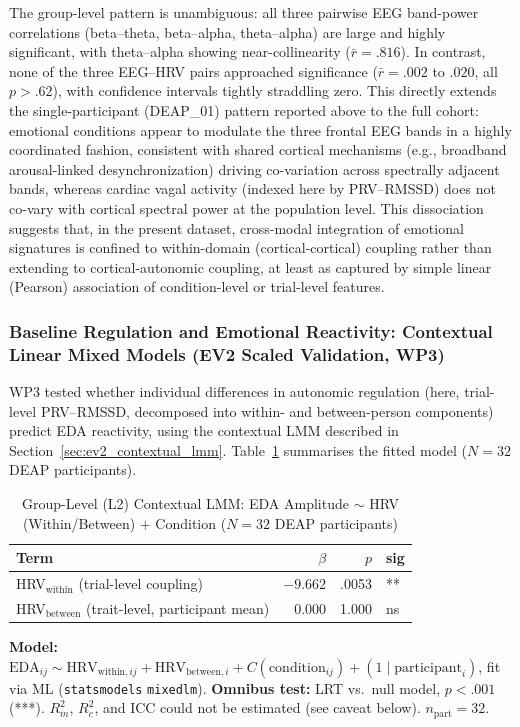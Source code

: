 The group-level pattern is unambiguous: all three pairwise EEG band-power correlations (beta--theta, beta--alpha, theta--alpha) are large and highly significant, with theta--alpha showing near-collinearity ($\bar{r} = .816$). In contrast, none of the three EEG--HRV pairs approached significance ($\bar{r} = .002$ to $.020$, all $p > .62$), with confidence intervals tightly straddling zero. This directly extends the single-participant (DEAP\_01) pattern reported above to the full cohort: emotional conditions appear to modulate the three frontal EEG bands in a highly coordinated fashion, consistent with shared cortical mechanisms (e.g., broadband arousal-linked desynchronization) driving co-variation across spectrally adjacent bands, whereas cardiac vagal activity (indexed here by \gls{PRV}--\gls{RMSSD}) does not co-vary with cortical spectral power at the population level. This dissociation suggests that, in the present dataset, cross-modal integration of emotional signatures is confined to within-domain (cortical-cortical) coupling rather than extending to cortical-autonomic coupling, at least as captured by simple linear (Pearson) association of condition-level or trial-level features.

\subsubsection{Baseline Regulation and Emotional Reactivity: Contextual Linear Mixed Models (EV2 Scaled Validation, WP3)}
\label{subsec:wp3_contextual}

WP3 tested whether individual differences in autonomic regulation (here, trial-level \gls{PRV}--\gls{RMSSD}, decomposed into within- and between-person components) predict \gls{EDA} reactivity, using the contextual \gls{LMM} described in Section~\ref{sec:ev2_contextual_lmm}. Table~\ref{tab:wp3_l2} summarises the fitted model ($N = 32$ DEAP participants).

\begin{table}[htbp]
    \centering
    \caption{Group-Level (L2) Contextual LMM: EDA Amplitude $\sim$ HRV (Within/Between) $+$ Condition ($N = 32$ DEAP participants)}
    \label{tab:wp3_l2}
    \small
    \begin{tabular}{lrrl}
        \hline
        \textbf{Term} & \textbf{$\beta$} & \textbf{$p$} & \textbf{sig} \\
        \hline
        HRV$_\text{within}$  (trial-level coupling)   & $-9.662$ & .0053 & ** \\
        HRV$_\text{between}$ (trait-level, participant mean) & 0.000 & 1.000 & ns \\
        \hline
    \end{tabular}
    \par\vspace{4pt}
    \noindent\parbox{\linewidth}{\scriptsize
    \textbf{Model:} $\text{EDA}_{ij} \sim \text{HRV}_{\text{within}, ij} + \text{HRV}_{\text{between}, i} + C(\text{condition}_{ij}) + (1 \mid \text{participant}_i)$, fit via ML (\texttt{statsmodels} \texttt{mixedlm}). \textbf{Omnibus test:} LRT vs.\ null model, $p < .001$ (***). $R^2_m$, $R^2_c$, and \gls{ICC} could not be estimated (see caveat below). $n_\text{part} = 32$.}
\end{table}


